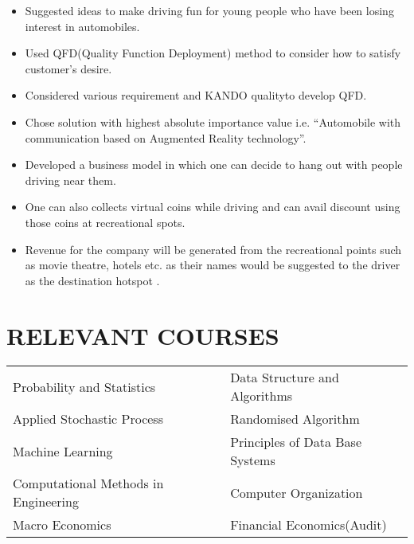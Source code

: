 \documentclass[margin]{res}
\begin{document}
\begin{resume}
\begin{itemize}
\item Suggested ideas to make driving fun for young people who have been losing interest in automobiles.
\item Used QFD(Quality Function Deployment) method to consider how to satisfy customer’s desire.
\item Considered various requirement and KANDO qualityto develop QFD.
\item Chose solution with highest absolute importance value i.e. “Automobile with communication based on Augmented Reality technology”.
\item Developed a business model in which one can decide to hang out with people driving near them.
\item One can also collects virtual coins while driving and can avail discount using those coins at recreational spots.
\item Revenue for the company will be generated from the recreational points such as movie theatre, hotels etc. as their names would be suggested to the driver as the destination hotspot .
\end{itemize}

\section{RELEVANT COURSES}
\begin{tabular}{ l l }
 Probability and Statistics & Data Structure and Algorithms\\  Applied Stochastic Process & Randomised Algorithm \\ 
   Machine Learning & Principles of Data Base Systems \\ Computational Methods in Engineering & Computer Organization  \\
  Macro Economics & Financial Economics(Audit) \\
\end{tabular}


\end{resume}
\end{document}
